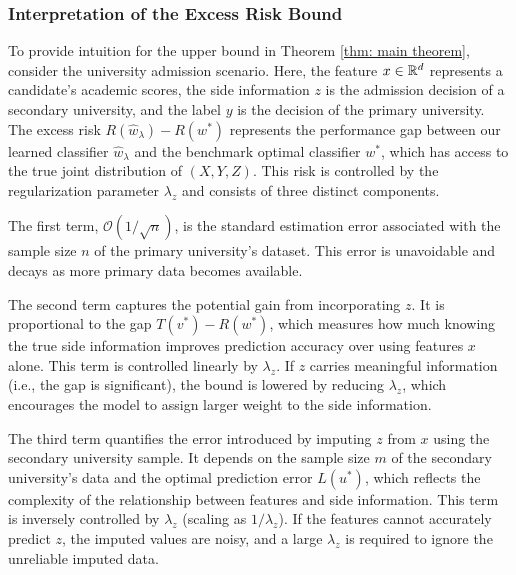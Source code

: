 \subsubsection{Interpretation of the Excess Risk Bound}

To provide intuition for the upper bound in Theorem \ref{thm: main theorem}, consider the university admission scenario. Here, the feature $x \in \mathbb{R}^d$ represents a candidate's academic scores, the side information $z$ is the admission decision of a secondary university, and the label $y$ is the decision of the primary university. The excess risk $R(\hat{w}_{\lambda}) - R(w^*)$ represents the performance gap between our learned classifier $\hat{w}_{\lambda}$ and the benchmark optimal classifier $w^*$, which has access to the true joint distribution of $(X, Y, Z)$. This risk is controlled by the regularization parameter $\lambda_z$ and consists of three distinct components.

The first term, $\mathcal{O}(1/\sqrt{n})$, is the standard estimation error associated with the sample size $n$ of the primary university's dataset. This error is unavoidable and decays as more primary data becomes available.

The second term captures the potential gain from incorporating $z$. It is proportional to the gap $T(v^*) - R(w^*)$, which measures how much knowing the true side information improves prediction accuracy over using features $x$ alone. This term is controlled linearly by $\lambda_z$. If $z$ carries meaningful information (i.e., the gap is significant), the bound is lowered by reducing $\lambda_z$, which encourages the model to assign larger weight to the side information.

The third term quantifies the error introduced by imputing $z$ from $x$ using the secondary university sample. It depends on the sample size $m$ of the secondary university's data and the optimal prediction error $L(u^*)$, which reflects the complexity of the relationship between features and side information. This term is inversely controlled by $\lambda_z$ (scaling as $1/\lambda_z$). If the features cannot accurately predict $z$, the imputed values are noisy, and a large $\lambda_z$ is required to ignore the unreliable imputed data.

